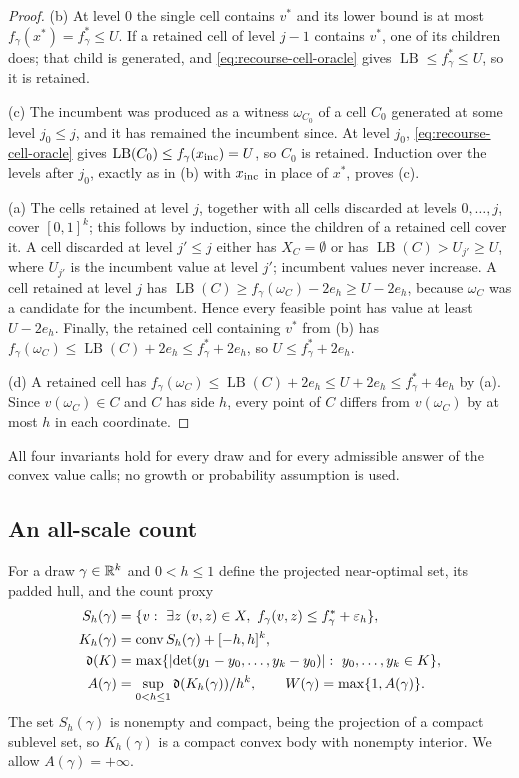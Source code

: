 \begin{proof}
(b) At level $0$ the single cell contains $v^*$ and its lower bound is
at most $f_\gamma(x^*)=f_\gamma^*\le U$. If a retained cell of level
$j-1$ contains $v^*$, one of its children does; that child is generated,
and \eqref{eq:recourse-cell-oracle} gives
$\operatorname{LB}\le f_\gamma^*\le U$, so it is retained.

(c) The incumbent was produced as a witness $\omega_{C_0}$ of a cell
$C_0$ generated at some level $j_0\le j$, and it has remained the
incumbent since. At level $j_0$, \eqref{eq:recourse-cell-oracle} gives
$\operatorname{LB}(C_0)\le f_\gamma(x_{\rm inc})=U$, so $C_0$ is
retained. Induction over the levels after $j_0$, exactly as in (b) with
$x_{\rm inc}$ in place of $x^*$, proves (c).

(a) The cells retained at level $j$, together with all cells discarded
at levels $0,\ldots,j$, cover $[0,1]^k$; this follows by induction,
since the children of a retained cell cover it. A cell discarded at
level $j'\le j$ either has $X_C=\emptyset$ or has
$\operatorname{LB}(C)>U_{j'}\ge U$, where $U_{j'}$ is the incumbent
value at level $j'$; incumbent values never increase. A cell retained
at level $j$ has $\operatorname{LB}(C)\ge f_\gamma(\omega_C)-2e_h\ge
U-2e_h$, because $\omega_C$ was a candidate for the incumbent. Hence
every feasible point has value at least $U-2e_h$. Finally, the
retained cell containing $v^*$ from (b) has
$f_\gamma(\omega_C)\le\operatorname{LB}(C)+2e_h\le f_\gamma^*+2e_h$,
so $U\le f_\gamma^*+2e_h$.

(d) A retained cell has $f_\gamma(\omega_C)\le\operatorname{LB}(C)+2e_h
\le U+2e_h\le f_\gamma^*+4e_h$ by (a). Since $v(\omega_C)\in C$ and $C$
has side $h$, every point of $C$ differs from $v(\omega_C)$ by at most
$h$ in each coordinate.
\end{proof}

All four invariants hold for every draw and for every admissible answer
of the convex value calls; no growth or probability assumption is used.

\subsection{An all-scale count}
\label{app:recourse-count}

For a draw $\gamma\in\mathbb R^k$ and $0<h\le1$ define the projected
near-optimal set, its padded hull, and the count proxy
\begin{align*}
 S_h(\gamma)&=\{v:\ \exists z\ (v,z)\in X,\
  f_\gamma(v,z)\le f_\gamma^*+\varepsilon_h\},\\
 K_h(\gamma)&=\operatorname{conv} S_h(\gamma)+[-h,h]^k,\\
 \mathfrak d(K)&=\max\{\left\lvert\det(y_1-y_0,\ldots,y_k-y_0)\right\rvert:\
  y_0,\ldots,y_k\in K\},\\
 A(\gamma)&=\sup_{0<h\le1}\mathfrak d(K_h(\gamma))/h^k,\qquad
 W(\gamma)=\max\{1,A(\gamma)\}.
\end{align*}
The set $S_h(\gamma)$ is nonempty and compact, being the projection of
a compact sublevel set, so $K_h(\gamma)$ is a compact convex body with
nonempty interior. We allow $A(\gamma)=+\infty$.

